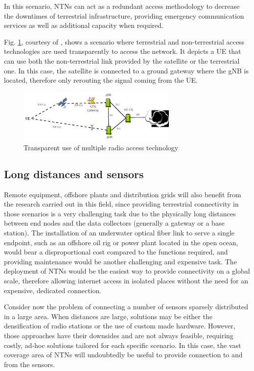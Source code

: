 In this scenario, \ac{NTNs} can act as a redundant access methodology to decrease the downtimes of terrestrial infrastructure, providing emergency communication services as well as additional capacity when required.

Fig. \ref{fig:multiple-connectivity}, courtesy of \cite{3gpp-tr-38.811}, shows a scenario where terrestrial and non-terrestrial access technologies are used transparently to access the network. It depicts a \ac{UE} that can use both the non-terrestrial link provided by the satellite or the terrestrial one. In this case, the satellite is connected to a ground gateway where the \ac{gNB} is located, therefore only rerouting the signal coming from the \ac{UE}.

\begin{figure}[ht]
    \centering
    \includegraphics[width=0.7\textwidth]{res/multiple-connectivity.png}
    \caption{Transparent use of multiple radio access technology \cite{3gpp-tr-38.811}}
    \label{fig:multiple-connectivity}
\end{figure}

\subsection{Long distances and sensors}
Remote equipment, offshore plants and distribution grids will also benefit from the research carried out in this field, since providing terrestrial connectivity in those scenarios is a very challenging task due to the physically long distances between end nodes and the data collectors (generally a gateway or a base station). The installation of an underwater optical fiber link to serve a single endpoint, such as an offshore oil rig or power plant located in the open ocean, would bear a disproportional cost compared to the functions required, and providing maintenance would be another challenging and expensive task. 
The deployment of \ac{NTN}s would be the easiest way to provide connectivity on a global scale, therefore allowing internet access in isolated places without the need for an expensive, dedicated connection.

Consider now the problem of connecting a number of sensors sparsely distributed in a large area. When distances are large, solutions may be either the densification of radio stations or the use of custom made hardware. However, those approaches have their downsides and are not always feasible, requiring costly, ad-hoc solutions tailored for each specific scenario. In this case, the vast coverage area of \ac{NTNs} will undoubtedly be useful to provide connection to and from the sensors\cite{performance-ntn-support-iot-wang}.

